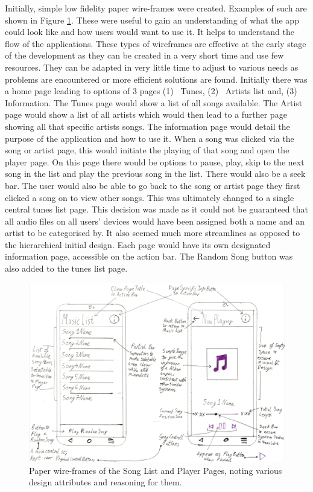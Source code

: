 \documentclass{l4proj}
\begin{document}
Initially, simple low fidelity paper wire-frames were created. Examples of such are shown in Figure \ref{fig:paperWF}. These were useful to gain an understanding of what the app could look like and how users would want to use it. It helps to understand the flow of the applications. These types of wireframes are effective at the early stage of the development as they can be created in a very short time and use few resources. They can be adapted in very little time to adjust to various needs as problems are encountered or more efficient solutions are found. Initially there was a home page leading to options of 3 pages (1)~ Tunes, (2)~ Artists list and, (3)~ Information. The Tunes page would show a list of all songs available. The Artist page would show a list of all artists which would then lead to a further page showing all that specific artists songs. The information page would detail the purpose of the application and how to use it. When a song was clicked via the song or artist page, this would initiate the playing of that song and open the player page. On this page there would be options to pause, play, skip to the next song in the list and play the previous song in the list. There would also be a seek bar. The user would also be able to go back to the song or artist page they first clicked a song on to view other songs. This was ultimately changed to a single central tunes list page. This decision was made as it could not be guaranteed that all audio files on all users’ devices would have been assigned both a name and an artist to be categorised by. It also seemed much more streamlines as opposed to the hierarchical initial design. Each page would have its own designated information page, accessible on the action bar. The Random Song button was also added to the tunes list page.

\begin{figure}[!htb]
    \centering
    \includegraphics[scale=0.0675]{images/papWF.jpg}
        \caption{Paper wire-frames of the Song List and Player Pages, noting various design attributes and reasoning for them.}
        \label{fig:paperWF}
\end{figure}
\end{document}
